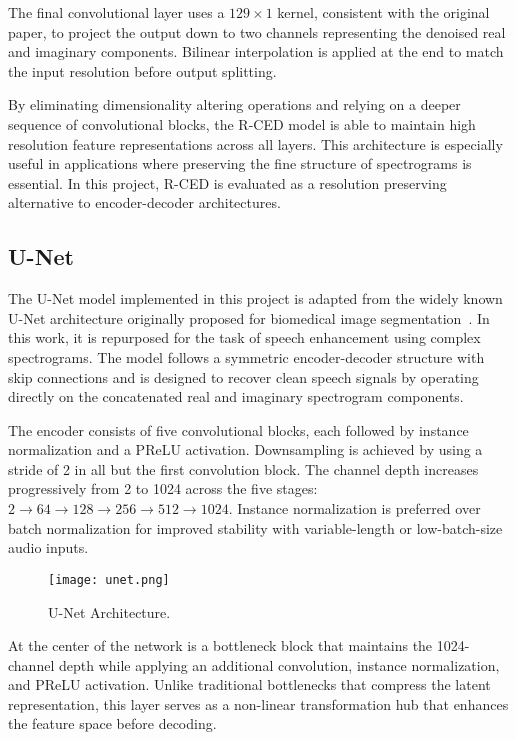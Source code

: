 The final convolutional layer uses a \(129 \times 1\) kernel, consistent with the original paper, to project the output down to two channels representing the denoised real and imaginary components. Bilinear interpolation is applied at the end to match the input resolution before output splitting.

By eliminating dimensionality altering operations and relying on a deeper sequence of convolutional blocks, the R-CED model is able to maintain high resolution feature representations across all layers. This architecture is especially useful in applications where preserving the fine structure of spectrograms is essential. In this project, R-CED is evaluated as a resolution preserving alternative to encoder-decoder architectures.

\subsection{U-Net}
\label{sec:unet}

The U-Net model implemented in this project is adapted from the widely known U-Net architecture originally proposed for biomedical image segmentation~\cite{ronneberger2015unet}. In this work, it is repurposed for the task of speech enhancement using complex spectrograms. The model follows a symmetric encoder-decoder structure with skip connections and is designed to recover clean speech signals by operating directly on the concatenated real and imaginary spectrogram components.

The encoder consists of five convolutional blocks, each followed by instance normalization and a PReLU activation. Downsampling is achieved by using a stride of 2 in all but the first convolution block. The channel depth increases progressively from 2 to 1024 across the five stages: \(2 \rightarrow 64 \rightarrow 128 \rightarrow 256 \rightarrow 512 \rightarrow 1024\). Instance normalization is preferred over batch normalization for improved stability with variable-length or low-batch-size audio inputs.

\begin{figure}[h]
    \centering
    \texttt{[image: unet.png]}
    \caption{\label{fig:unet}U-Net Architecture.}
\end{figure}

At the center of the network is a bottleneck block that maintains the 1024-channel depth while applying an additional convolution, instance normalization, and PReLU activation. Unlike traditional bottlenecks that compress the latent representation, this layer serves as a non-linear transformation hub that enhances the feature space before decoding.

